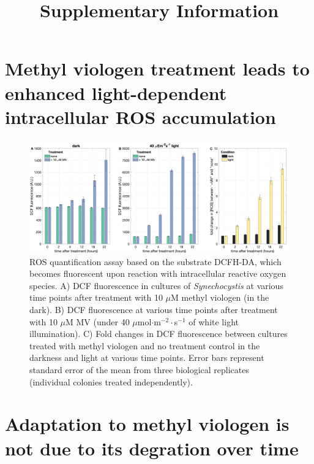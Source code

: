 \documentclass[12pt]{article}
\title{\textbf{Supplementary Information} 
}
\author{}
\date{}
\begin{document}
\maketitle



\section{Methyl viologen treatment leads to enhanced light-dependent intracellular ROS accumulation}


\begin{figure}[H]
    \centering
    \includegraphics[width=\hsize]{../Figures/MV_adaptation/MV_ROS_DFCDA_Syn6803.png}
    \caption{ROS quantification assay based on the substrate DCFH-DA, which becomes fluorescent upon reaction with intracellular reactive oxygen species. A) DCF fluorescence in cultures of \textit{Synechocystis} at various time points after treatment with 10 $\mu$M methyl viologen (in the dark). B) DCF fluorescence at various time points after treatment with 10 $\mu$M MV (under 40 $\mu$mol$\cdot$m$^{-2}\cdot$s$^{-1}$ of white light illumination). C) Fold changes in DCF fluorescence between cultures treated with methyl viologen and no treatment control in the darkness and light at various time points. Error bars represent standard error of the mean from three biological replicates (individual colonies treated independently).}
    \label{fig:spectraMV1}
\end{figure}

\newpage

\section{Adaptation to methyl viologen is not due to its degration over time}
\end{document}
